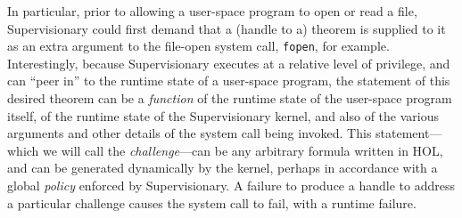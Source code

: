 \documentclass[a4paper, UKenglish, cleveref, autoref, thm-restate, colorlinks]{lipics-v2021}
\begin{document}
In particular, prior to allowing a user-space program to open or read a file, Supervisionary could first demand that a (handle to a) theorem is supplied to it as an extra argument to the file-open system call, \texttt{fopen}, for example.
Interestingly, because Supervisionary executes at a relative level of privilege, and can ``peer in'' to the runtime state of a user-space program, the statement of this desired theorem can be a \emph{function} of the runtime state of the user-space program itself, of the runtime state of the Supervisionary kernel, and also of the various arguments and other details of the system call being invoked.
This statement---which we will call the \emph{challenge}---can be any arbitrary formula written in HOL, and can be generated dynamically by the kernel, perhaps in accordance with a global \emph{policy} enforced by Supervisionary.
A failure to produce a handle to address a particular challenge causes the system call to fail, with a runtime failure.
\end{document}
